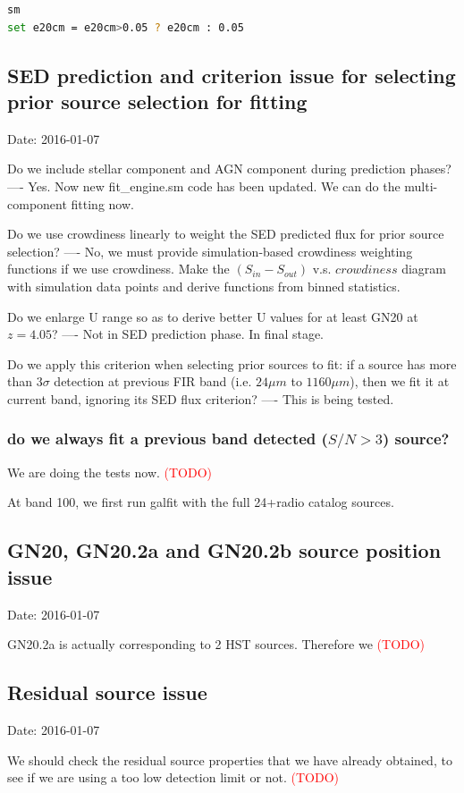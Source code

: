 \documentclass[11pt,a4paper]{article}
\begin{document}
\begin{lstlisting}[language=bash]
sm
set e20cm = e20cm>0.05 ? e20cm : 0.05
\end{lstlisting}


\subsection{SED prediction and criterion issue for selecting prior source selection for fitting}

\textcolor{green!90!black!60!orange}{Date: 2016-01-07}

Do we include stellar component and AGN component during prediction phases? ---- Yes. Now new fit\_engine.sm code has been updated. We can do the multi-component fitting now. 

Do we use crowdiness linearly to weight the SED predicted flux for prior source selection? ---- No, we must provide simulation-based crowdiness weighting functions if we use crowdiness. Make the $(S_{in}-S_{out})$ v.s. $crowdiness$ diagram with simulation data points and derive functions from binned statistics. 

Do we enlarge U range so as to derive better U values for at least GN20 at $z=4.05$? ---- Not in SED prediction phase. In final stage. 

Do we apply this criterion when selecting prior sources to fit: if a source has more than $3\sigma$ detection at previous FIR band (i.e. $24{\mu}m$ to $1160{\mu}m$), then we fit it at current band, ignoring its SED flux criterion? ---- This is being tested. 

\subsubsection{do we always fit a previous band detected ($S/N>3$) source?}

We are doing the tests now.
\textcolor{red}{(TODO)}

At band 100, we first run galfit with the full 24+radio catalog sources. 



\subsection{GN20, GN20.2a and GN20.2b source position issue}

\textcolor{green!90!black!60!orange}{Date: 2016-01-07}

GN20.2a is actually corresponding to 2 HST sources. Therefore we 
\textcolor{red}{(TODO)}



\subsection{Residual source issue}

\textcolor{green!90!black!60!orange}{Date: 2016-01-07}

We should check the residual source properties that we have already obtained, to see if we are using a too low detection limit or not.  
\textcolor{red}{(TODO)}
\end{document}
